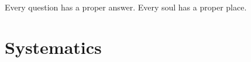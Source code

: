 \begin{savequote}[75mm]
Every question has a proper answer. Every soul has a proper place.
\end{savequote}

\chapter{Systematics}
\label{sec:systematics}
